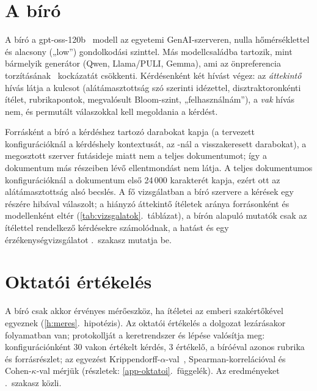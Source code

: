 \section{A bíró}
\label{sec:biro}

A bíró a gpt-oss-120b~\cite{gptoss2025} modell az egyetemi GenAI-szerveren, nulla hőmérséklettel és
alacsony („low”) gondolkodási szinttel. Más modellcsaládba tartozik, mint bármelyik generátor (Qwen,
Llama/PULI, Gemma), ami az önpreferencia torzításának~\cite{panickssery2024selfpref} kockázatát
csökkenti. Kérdésenként két hívást végez: az \emph{áttekintő} hívás látja a kulcsot (alátámasztottság szó
szerinti idézettel, disztraktoronkénti ítélet, rubrikapontok, megvalósult Bloom-szint, „felhasználnám”), a
\emph{vak} hívás nem, és permutált válaszokkal kell megoldania a kérdést.

Forrásként a bíró a kérdéshez tartozó darabokat kapja (a tervezett konfigurációknál a kérdéshely
kontextusát, az -nál a visszakeresett darabokat), a megosztott szerver futásideje miatt nem a
teljes dokumentumot; így a dokumentum más részeiben lévő ellentmondást nem látja. A teljes dokumentumos
konfigurációknál a dokumentum első 24\,000 karakterét kapja, ezért ott az alátámasztottság alsó becslés. A
fő vizsgálatban a bíró szervere a kérések egy részére hibával válaszolt; a hiányzó áttekintő ítéletek
aránya forrásonként és modellenként eltér (\ref{tab:vizsgalatok}.~táblázat), a bírón alapuló mutatók csak
az ítélettel rendelkező kérdésekre számolódnak, a hatást és egy érzékenységvizsgálatot
\az{\ref{sec:fo-meres}}.~szakasz mutatja be.

\section{Oktatói értékelés}
\label{sec:oktatoi}

A bíró csak akkor érvényes mérőeszköz, ha ítéletei az emberi szakértőkével egyeznek
(\ref{h:meres}.~hipotézis). Az oktatói értékelés a dolgozat lezárásakor folyamatban van; protokollját a
keretrendszer  és  lépése valósítja meg: konfigurációnként 30 vakon
értékelt kérdés, 3 értékelő, a bíróéval azonos rubrika és forrásrészlet; az egyezést
Krippendorff-$\alpha$-val~\cite{krippendorff2004}, Spearman-korrelációval és Cohen-$\kappa$-val mérjük
(részletek: \ref{app-oktatoi}.~függelék). Az eredményeket \az{\ref{sec:oktatoi-eredmeny}}.~szakasz közli.

